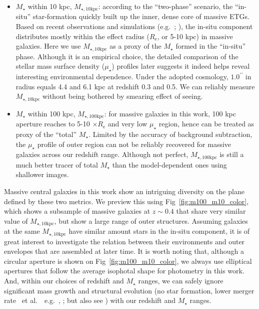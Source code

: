 \documentclass{emulateapj}
\def\arcsec{{\prime\prime}}
\def\etal{{\ et al.~}}
\def\mstar{{$M_{\star}$}}
\def\minn{{$M_{\star,10\mathrm{kpc}}$}}
\def\mtot{{$M_{\star,100\mathrm{kpc}}$}}
\def\mden{{$\mu_{\star}$}}
\begin{document}
\begin{CJK*}{UTF8}{gbsn}
    \begin{itemize}
        \item \mstar{} within 10 kpc, \minn{}: according to the ``two-phase'' 
            scenario, the ``in-situ'' star-formation quickly built up the inner, dense 
            core of massive ETGs.  
            Based on recent observations and simulations (e.g.~\citealt{vanDokkum2010}; 
            \citealt{RodriguezGomez2016}), the in-situ 
            component distributes mostly within the effect radius ($R_{\mathrm{e}}$, 
            or 5-10 kpc) in massive galaxies.  
            Here we use \minn{} as a proxy of the \mstar{} formed in the ``in-situ''
            phase.  Although it is an empirical choice, the detailed comparison of 
            the stellar mass surface density (\mden{}) profiles later suggests it indeed 
            helps reveal interesting environmental dependence.  
            Under the adopted cosmology, $1.0^{\arcsec}$ in radius equals 4.4 and 6.1 kpc 
            at redshift 0.3 and 0.5.  
            We can reliably measure \minn{} without being bothered by smearing effect
            of seeing.
        \item \mstar{} within 100 kpc, \mtot{}: for massive galaxies in this work, 
            100 kpc aperture reaches to 5-10 $\times R_{\mathrm{e}}$ and very low 
            \mden{} region, hence can be treated as proxy of the ``total'' \mstar{}. 
            Limited by the accuracy of background subtraction, the \mden{} profile 
            of outer region can not be reliably recovered for massive galaxies across 
            our redshift range. 
            Although not perfect, \mtot{} is still a much better tracer of total 
            \mstar{} than the model-dependent ones using shallower images.
    \end{itemize}
    
    Massive central galaxies in this work show an intriguing diversity on the 
    plane defined by these two metrics.  
    We preview this using Fig~\ref{fig:m100_m10_color}, which shows a subsample of 
    massive galaxies at $z\sim 0.4$ that share very similar value of \minn{}, but show 
    a large range of outer structures. 
    Assuming galaxies at the same \minn{} have similar amount stars in the in-situ 
    component, it is of great interest to investigate the relation between their 
    environments and outer envelopes that are assembled at later time. 
    It is worth noting that, although a circular aperture is shown on 
    Fig~\ref{fig:m100_m10_color}, we always use elliptical apertures that follow the 
    average isophotal shape for photometry in this work.
    And, within our choices of redshift and \mstar{} ranges, we can safely ignore 
    significant mass growth and structural evolution 
    (no star formation, lower merger rate \etal~e.g.\ \citealt{Bellstedt2016},
    \citealt{Inagaki2015}; but also see \citealt{Bai2014}) 
    with our redshift and \mstar{} ranges. 


\end{CJK*}
\end{document}
